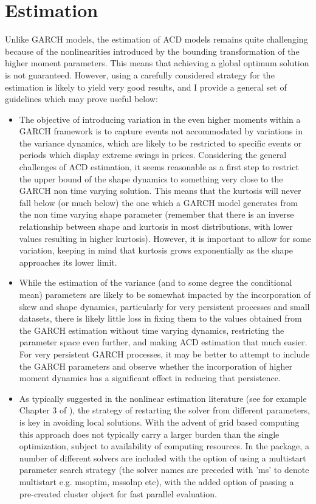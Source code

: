 \section{Estimation}\label{sec:estimation}
Unlike GARCH models, the estimation of ACD models remains quite challenging because of the nonlinearities introduced by the bounding transformation of the higher moment parameters. This means that achieving a global optimum solution is not guaranteed. However, using a carefully considered strategy for the estimation is likely to yield very good results, and I provide a general set of guidelines which may prove useful below:
\begin{itemize}
\item The objective of introducing variation in the even higher moments within a GARCH framework is to capture events not accommodated by variations in the variance dynamics, which are likely to be restricted to specific events or periods which display extreme swings in prices. Considering the general challenges of ACD estimation, it seems reasonable as a first step to restrict the upper bound of the shape dynamics to something very close to the GARCH non time varying solution. This means that the kurtosis will never fall below (or much below) the one which a GARCH model generates from the non time varying shape parameter (remember that there is an inverse relationship between shape and kurtosis in most distributions, with lower values resulting in higher kurtosis). However, it is important to allow for some variation, keeping in mind that kurtosis grows exponentially as the shape approaches its lower limit.\\
\item While the estimation of the variance (and to some degree the conditional mean) parameters are likely to be somewhat impacted by the incorporation of skew and shape dynamics, particularly for very persistent processes and small datasets, there is likely little loss in fixing them to the values obtained from the GARCH estimation without time varying dynamics, restricting the parameter space even further, and making ACD estimation that much easier. For very persistent GARCH processes, it may be better to attempt to include the GARCH parameters and observe whether the incorporation of higher moment dynamics has a significant effect in reducing that persistence.\\
\item As typically suggested in the nonlinear estimation literature (see for example Chapter 3 of \citet{Franses2000}), the strategy of restarting the solver from different parameters, is key in avoiding local solutions. With the advent of grid based computing this approach does not typically carry a larger burden than the single optimization, subject to availability of computing resources. In the \verb@racd@ package, a number of different solvers are included with the option of using a multistart parameter search strategy (the solver names are preceded with 'ms' to denote multistart e.g. msoptim, mssolnp etc), with the added option of passing a pre-created cluster object for fast parallel evaluation.

\end{itemize}
